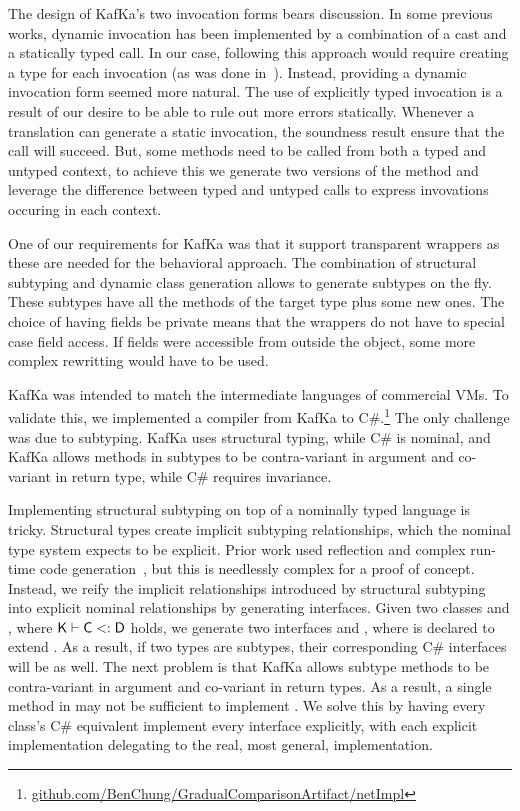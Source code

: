 \documentclass[a4paper,USenglish]{lipics-v2018}
\newcommand{\EM}[1]{\ensuremath{#1}\xspace}
\newcommand{\xt}[1]{{\sf{#1}}}
\newcommand{\EMxt}[1]{\EM{\xt{#1}}}
\newcommand{\K}{\EMxt K}
\newcommand{\Sub}{\EM{<:}}
\newcommand{\kafka}{{\sf KafKa}\xspace}
\newcounter{lem}
\begin{document}
The design of \kafka's two invocation forms bears discussion. In some
previous works, dynamic invocation has been implemented by a combination of
a cast and a statically typed call. In our case, following this approach
would require creating a type for each invocation (as was done
in~\cite{popl10}). Instead, providing a dynamic invocation form seemed more
natural. The use of explicitly typed invocation is a result of our desire
to be able to rule out more errors statically. Whenever a translation can
generate a static invocation, the soundness result ensure that the call will
succeed. But, some methods need to be called from both a typed and untyped
context, to achieve this we generate two versions of the method and leverage
the difference between typed and untyped calls to express invovations
occuring in each context.

One of our requirements for \kafka was that it support transparent wrappers
as these are needed for the behavioral approach. The combination of
structural subtyping and dynamic class generation allows to generate
subtypes on the fly. These subtypes have all the methods of the target type
plus some new ones. The choice of having fields be private means that the
wrappers do not have to special case field access. If fields were accessible
from outside the object, some more complex rewritting would have to be
used.

\kafka was intended to match the intermediate languages of commercial VMs.
To validate this, we implemented a compiler from \kafka to
C\#.\footnote{\small\url{github.com/BenChung/GradualComparisonArtifact/netImpl}}
The only challenge was due to subtyping. \kafka uses structural typing,
while C\# is nominal, and \kafka allows methods in subtypes to be
contra-variant in argument and co-variant in return type, while C\# requires
invariance. 

Implementing structural subtyping on top of a nominally typed
language is tricky. Structural types create implicit subtyping
relationships, which the nominal type system expects to be explicit. Prior
work used reflection and complex run-time code
generation~\cite{StructuralTypesOnJVM}, but this is needlessly complex for a
proof of concept. Instead, we reify the implicit relationships introduced
by structural subtyping into explicit nominal relationships by generating
interfaces. Given two classes \C and \D, where $\K\vdash \C \Sub \D$ holds,
we generate two interfaces \xt{CI} and \xt{DI}, where \xt{CI} is declared to
extend \xt{DI}. As a result, if two types are subtypes, their corresponding
C\# interfaces will be as well. The next problem is that \kafka allows
subtype methods to be contra-variant in argument and co-variant in return
types. As a result, a single method in \xt{CI} may not be sufficient to
implement \xt{DI}. We solve this by having every class's C\# equivalent
implement every interface explicitly, with each explicit implementation
delegating to the real, most general, implementation. 
\end{document}
